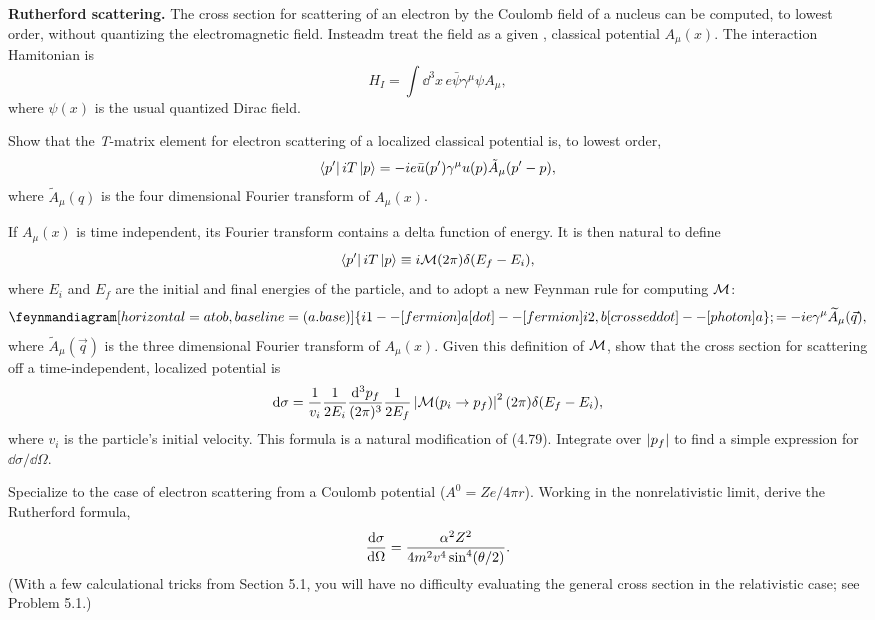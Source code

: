 \problem \textbf{Rutherford scattering.} The cross section for scattering of an electron by the Coulomb field of a nucleus can be computed, to lowest 
order, without quantizing the electromagnetic field. Insteadm treat the field as a given , classical potential $A_\mu(x)$. The interaction Hamitonian
is 
\begin{equation*}
    H_I = \int \dd^3 x \, e\bar{\psi}\gamma^\mu\psi A_\mu,
\end{equation*}
where $\psi(x)$ is the usual quantized Dirac field.
\begin{problembody}
    \item Show that the \textit{T}-matrix element for electron scattering of a localized classical potential is, to lowest order,
    \begin{equation*}
        \left\langle p'\right|iT\left|p\right\rangle = -ie\bar{u}(p')\gamma^\mu u(p) \tilde{A}_\mu(p' - p),
    \end{equation*}
    where $\widetilde{A}_\mu(q)$ is the four dimensional Fourier transform of $A_\mu(x)$.

    \item If $A_\mu(x)$ is time independent, its Fourier transform contains a delta function of energy. It is then natural to define
    \begin{equation*}
        \left\langle p'\right|iT\left|p\right\rangle \equiv i\mathcal{M} (2\pi) \delta(E_f - E_i),
    \end{equation*}
    where $E_i$ and $E_f$ are the initial and final energies of the particle, and to adopt a new Feynman rule for computing $\mathcal{M}$:
    \begin{equation*}
        \feynmandiagram[horizontal = a to b, baseline = (a.base)]{
            i1 -- [fermion] a [dot] -- [fermion] i2,
            b [crossed dot] -- [photon] a
        };
        = -ie\gamma^\mu\widetilde{A}_\mu(\vec{q}),
    \end{equation*}
    where $\widetilde{A}_\mu(\vec{q})$ is the three dimensional Fourier transform of $A_\mu(x)$. Given this definition of $\mathcal{M}$, show that the cross section 
    for scattering off a time-independent, localized potential is
    \begin{equation*}
        \mathrm{d}\sigma = \frac{1}{v_i}\frac{1}{2E_i}\frac{\mathrm{d}^3p_f}{(2\pi)^3}
        \frac{1}{2E_f}\left| \mathcal{M}(p_i \to p_f) \right|^2 (2\pi)\delta(E_f - E_i),
    \end{equation*}
    where $v_i$ is the particle's initial velocity. This formula is a natural modification of (4.79). Integrate over $\left| p_f \right|$ to find a simple expression for $\dd\sigma / \dd \Omega$.

    \item Specialize to the case of electron scattering from a Coulomb potential ($A^0 = Ze / 4\pi r$). Working in the nonrelativistic limit, derive the Rutherford formula,
    \begin{equation*}
        \frac{\mathrm{d} \sigma}{\mathrm{d} \Omega} = \frac{\alpha^2 Z^2}{4m^2v^4\sin^4(\theta / 2)}.
    \end{equation*}
    (With a few calculational tricks from Section 5.1, you will have no difficulty evaluating the general cross section in the relativistic case; see Problem 5.1.)
\end{problembody}

